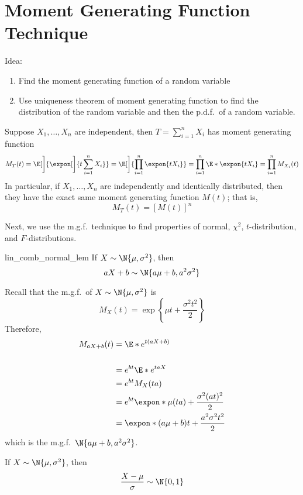 \section{Moment Generating Function Technique}
Idea:
\begin{enumerate}[label=(\arabic*)]
    \item Find the moment generating function of a random variable
    \item Use uniqueness theorem of moment generating function
          to find the distribution of the random variable and then
          the p.d.f.\ of a random variable.
\end{enumerate}
\begin{Theorem}{}{}
    Suppose $ X_1,\ldots,X_n $
    are independent, then $ T=\sum_{i=1}^{n} X_i $
    has moment generating function
    \[ M_T(t)=\E[\bigg]{\expon[\bigg]{t \sum_{i=1}^{n} X_i}}=
        \E[\bigg]{\prod_{i=1}^n \expon{tX_i}}=\prod_{i=1}^n \E*{\expon{tX_i}}=
        \prod_{i=1}^n M_{X_i}(t) \]
    In particular, if $ X_1,\ldots,X_n $ are independently
    and identically distributed, then they
    have the exact same moment generating function $ M(t) $;
    that is,
    \[ M_T(t)=\left[ M(t) \right]^n \]
\end{Theorem}
Next, we use the m.g.f.\ technique to find properties
of normal, $ \chi^2 $, $ t $-distribution,
and $ F $-distributions.

\begin{Lemma}{}{lin_comb_normal_lem}
    If $ X \sim \N{\mu,\sigma^2} $, then
    \[ aX+b \sim \N{a\mu+b,a^2\sigma^2} \]
\end{Lemma}
\begin{Proof}{}{}
    Recall that the m.g.f.\ of $ X \sim \N{\mu,\sigma^2} $ is
    \[ M_X(t)
        =\exp\left\{ \mu t+\frac{\sigma^2t^2}{2}\right\} \]
    Therefore,
    \begin{align*}
        M_{aX+b}(t)
         & =\E*{e^{t(aX+b)}}                                 \\                                                            \\
         & =e^{b t}\E*{e^{taX}}                              \\
         & =e^{b t}M_X(ta)                                   \\
         & =e^{b t}\expon*{\mu(ta)+\frac{\sigma^2(at)^2}{2}} \\
         & =\expon*{(a\mu+b)t+\frac{a^2\sigma^2t^2}{2}}
    \end{align*}
    which is the m.g.f.\ $ \N{a\mu+b,a^2\sigma^2} $.
\end{Proof}
\begin{Theorem}{}{}
    If $ X \sim \N{\mu,\sigma^2} $, then
    \[ \frac{X-\mu}{\sigma} \sim \N{0,1} \]
\end{Theorem}

